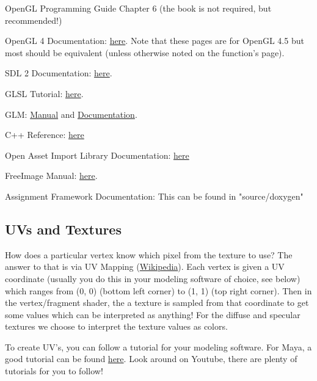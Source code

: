 \documentclass{article}
\begin{document}
\begin{enumerate*}
    \item OpenGL Programming Guide Chapter 6 (the book is not required, but recommended!)
    \item OpenGL 4 Documentation: \href{https://www.opengl.org/sdk/docs/man4/}{here}. Note that these pages are for OpenGL 4.5 but most should be equivalent (unless otherwise noted on the function's page).
    \item SDL 2 Documentation: \href{https://wiki.libsdl.org/CategoryAPI}{here}.
    \item GLSL Tutorial: \href{http://www.lighthouse3d.com/tutorials/glsl-tutorial/}{here}.
    \item GLM: \href{http://glm.g-truc.net/0.9.7/glm-0.9.7.pdf}{Manual} and \href{http://glm.g-truc.net/0.9.7/api/index.html}{Documentation}.
    \item C++ Reference: \href{http://en.cppreference.com/w/}{here}
    \item Open Asset Import Library Documentation: \href{http://assimp.sourceforge.net/lib_html/index.html}{here}
    \item FreeImage Manual: \href{http://downloads.sourceforge.net/freeimage/FreeImage3170.pdf}{here}.
    \item Assignment Framework Documentation: This can be found in "source/doxygen"
\end{enumerate*}

\subsection*{UVs and Textures}

How does a particular vertex know which pixel from the texture to use? The answer to that is via UV Mapping (\href{https://en.wikipedia.org/wiki/UV_mapping}{Wikipedia}). Each vertex is given a UV coordinate (usually you do this in your modeling software of choice, see below) which ranges from (0, 0) (bottom left corner) to (1, 1) (top right corner). Then in the vertex/fragment shader, the a texture is sampled from that coordinate to get some values which can be interpreted as anything! For the diffuse and specular textures we choose to interpret the texture values as colors.

To create UV's, you can follow a tutorial for your modeling software. For Maya, a good tutorial can be found \href{https://www.youtube.com/watch?v=HLhazEa8wmw}{here}. Look around on Youtube, there are plenty of tutorials for you to follow!
\end{document}
